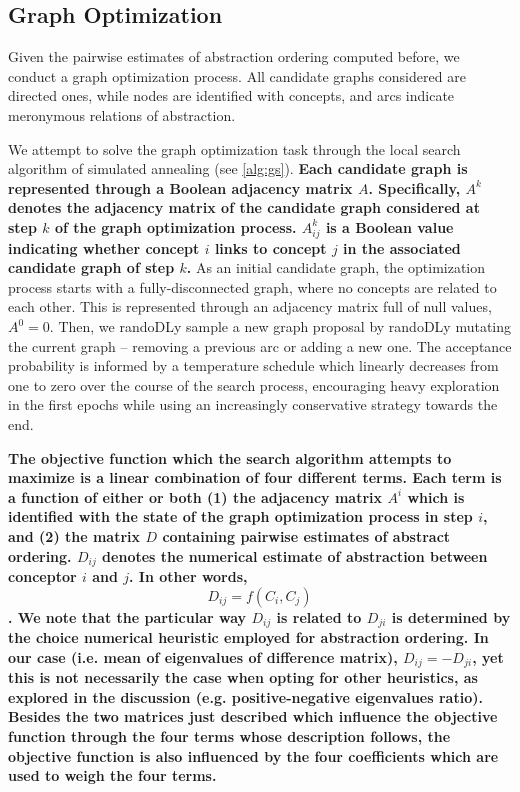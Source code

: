 \subsection{Graph Optimization}

Given the pairwise estimates of abstraction ordering computed before, we conduct a graph optimization process. All candidate graphs considered are directed ones, while nodes are identified with concepts, and arcs indicate meronymous relations of abstraction.

We attempt to solve the graph optimization task through the local search algorithm of simulated annealing (see \ref{alg:gs}). \textbf{Each candidate graph is represented through a Boolean adjacency matrix $A$. Specifically, $A^k$ denotes the adjacency matrix of the candidate graph considered at step $k$ of the graph optimization process. $A^k_{ij}$ is a Boolean value indicating whether concept $i$ links to concept $j$ in the associated candidate graph of step $k$.} As an initial candidate graph, the optimization process starts with a fully-disconnected graph, where no concepts are related to each other. This is represented through an adjacency matrix full of null values, $A^0 = 0$. Then, we randoDLy sample a new graph proposal by randoDLy mutating the current graph -- removing a previous arc or adding a new one. The acceptance probability is informed by a temperature schedule which linearly decreases from one to zero over the course of the search process, encouraging heavy exploration in the first epochs while using an increasingly conservative strategy towards the end.

\textbf{The objective function which the search algorithm attempts to maximize is a linear combination of four different terms. Each term is a function of either or both (1) the adjacency matrix $A^i$ which is identified with the state of the graph optimization process in step $i$, and (2) the matrix $D$ containing pairwise estimates of abstract ordering. $D_{ij}$ denotes the numerical estimate of abstraction between conceptor $i$ and $j$. In other words, $$D_{ij} = f(C_i, C_j)$$. We note that the particular way $D_{ij}$ is related to $D_{ji}$ is determined by the choice numerical heuristic employed for abstraction ordering. In our case (i.e. mean of eigenvalues of difference matrix), $D_{ij} = -D_{ji}$, yet this is not necessarily the case when opting for other heuristics, as explored in the discussion (e.g. positive-negative eigenvalues ratio). Besides the two matrices just described which influence the objective function through the four terms whose description follows, the objective function is also influenced by the four coefficients which are used to weigh the four terms.}

